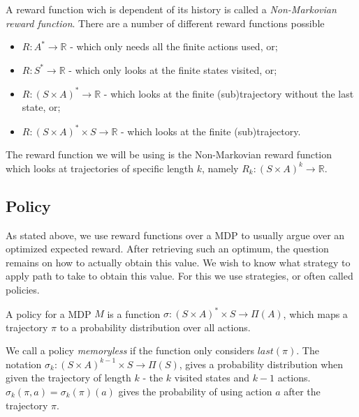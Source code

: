 
A reward function wich is dependent of its history is called a \textit{Non-Markovian reward function}. There are a number of different reward functions possible
\begin{itemize}
	\item $R:A^*\to\mathbb{R}$ - which only needs all the finite actions used, or;
	\item $R:S^*\to\mathbb{R}$ - which only looks at the finite states visited, or;
	\item $R:(S\times A)^*\to\mathbb{R}$ - which looks at the finite (sub)trajectory without the last state, or;
	\item $R:(S\times A)^*\times S\to \mathbb{R}$ - which looks at the finite (sub)trajectory.
\end{itemize}

The reward function we will be using is the Non-Markovian reward function which looks at trajectories of specific length $k$, namely $R_k:(S\times A)^k\to\mathbb{R}$. 



\subsection*{Policy}
As stated above, we use reward functions over a MDP to usually argue over an optimized expected reward. After retrieving such an optimum, the question remains on how to actually obtain this value. We wish to know what strategy to apply path to take to obtain this value. For this we use strategies, or often called policies. 

\begin{definition}
	A policy for a MDP $M$ is a function $\sigma:(S\times A)^*\times S \to \Pi(A)$, which maps a trajectory $\pi$ to a probability distribution over all actions. 
\end{definition}

We call a policy \textit{memoryless} if the function only considers $last(\pi)$. The notation $\sigma_k:(S\times A)^{k-1}\times S\to \Pi(S)$, gives a probability distribution when given the trajectory of length $k$ - the $k$ visited states and $k-1$ actions. $\sigma_k(\pi,a)=\sigma_k(\pi)(a)$ gives the probability of using action $a$ after the trajectory $\pi$.


